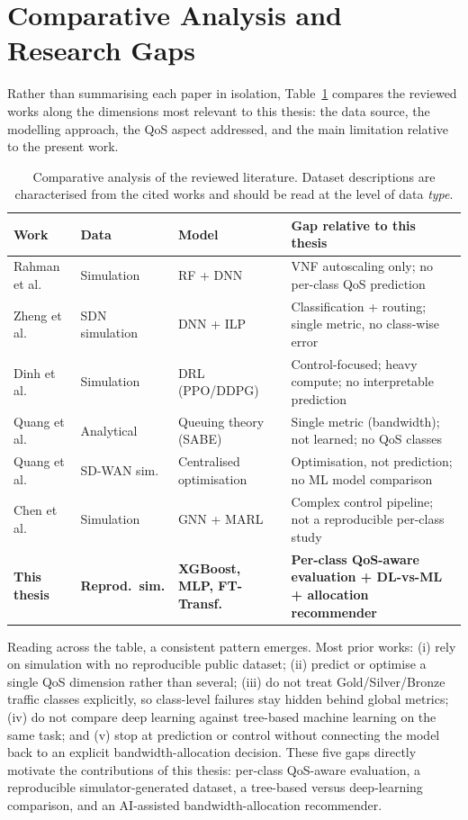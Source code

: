 \documentclass[a4paper,12pt]{Classes/RoboticsLaTeX}
\begin{document}
\section{Comparative Analysis and Research Gaps}

Rather than summarising each paper in isolation, Table~\ref{tab:lit-comparison} compares the reviewed works along the dimensions most relevant to this thesis: the data source, the modelling approach, the QoS aspect addressed, and the main limitation relative to the present work.

\begin{table}[H]
\centering
\caption{Comparative analysis of the reviewed literature. Dataset descriptions are characterised from the cited works and should be read at the level of data \emph{type}.}
\label{tab:lit-comparison}
\small
\begin{tabular}{|p{2.4cm}|p{1.9cm}|p{2.6cm}|p{3.9cm}|}
\hline
\textbf{Work} & \textbf{Data} & \textbf{Model} & \textbf{Gap relative to this thesis} \\
\hline
Rahman et al.~\cite{rahman2019autoscaling} & Simulation & RF + DNN & VNF autoscaling only; no per-class QoS prediction \\
\hline
Zheng et al.~\cite{zheng2022applicationaware} & SDN simulation & DNN + ILP & Classification + routing; single metric, no class-wise error \\
\hline
Dinh et al.~\cite{dinh2024safeloadbalancing} & Simulation & DRL (PPO/DDPG) & Control-focused; heavy compute; no interpretable prediction \\
\hline
Quang et al.~\cite{quang2023globalqos} & Analytical & Queuing theory (SABE) & Single metric (bandwidth); not learned; no QoS classes \\
\hline
Quang et al.~\cite{quang2022routing} & SD-WAN sim. & Centralised optimisation & Optimisation, not prediction; no ML model comparison \\
\hline
Chen et al.~\cite{chen2025mteal} & Simulation & GNN + MARL & Complex control pipeline; not a reproducible per-class study \\
\hline
\textbf{This thesis} & \textbf{Reprod.\ sim.} & \textbf{XGBoost, MLP, FT-Transf.} & \textbf{Per-class QoS-aware evaluation + DL-vs-ML + allocation recommender} \\
\hline
\end{tabular}
\end{table}

Reading across the table, a consistent pattern emerges. Most prior works: (i) rely on simulation with no reproducible public dataset; (ii) predict or optimise a single QoS dimension rather than several; (iii) do not treat Gold/Silver/Bronze traffic classes explicitly, so class-level failures stay hidden behind global metrics; (iv) do not compare deep learning against tree-based machine learning on the same task; and (v) stop at prediction or control without connecting the model back to an explicit bandwidth-allocation decision. These five gaps directly motivate the contributions of this thesis: per-class QoS-aware evaluation, a reproducible simulator-generated dataset, a tree-based versus deep-learning comparison, and an AI-assisted bandwidth-allocation recommender.
\end{document}
